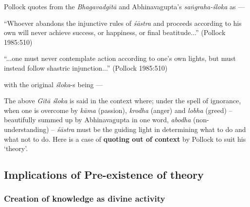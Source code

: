 Pollock quotes from the {\sl Bhagavadgītā} and Abhinavagupta's {\sl saṅgraha-śloka} as ---
\begin{myquote}
``Whoever abandons the injunctive rules of {\sl śāstra} and proceeds according to his own will never achieve success, or happiness, or ﬁnal beatitude...” (Pollock 1985:510)

``...one must never contemplate action according to one's own lights, but must instead follow shastric injunction...'' (Pollock 1985:510)
\end{myquote}
with the original {\sl śloka}-s being ---

The above {\sl Gītā śloka} is said in the context where; under the spell of ignorance, when one is overcome by {\sl kāma} (passion), {\sl krodha} (anger) and {\sl lobha} (greed) -- beautifully summed up by Abhinavagupta in one word, {\sl abodha} (non-understanding) -- {\sl śāstra} must be the guiding light in determining what to do and what not to do. Here is a case of {\bf quoting out of context} by Pollock to suit his `theory'.

\subsection{Implications of Pre-existence of theory}\label{art12-sec3.8}

\subsubsection{Creation of knowledge as divine activity}\label{art12-sec3.8.1}



